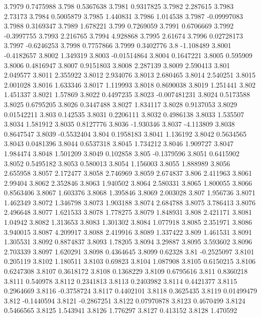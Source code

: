 3.7979  0.7475988
3.798  0.5367638
3.7981  0.9317825
3.7982  2.287615
3.7983  2.73173
3.7984  0.5005879
3.7985  1.440831
3.7986  1.014538
3.7987  -0.09997083
3.7988  0.3169347
3.7989  1.678221
3.799  0.7269059
3.7991  0.6706669
3.7992  -0.3997755
3.7993  2.216765
3.7994  4.928868
3.7995  2.61674
3.7996  0.02728173
3.7997  -0.6246253
3.7998  0.7757866
3.7999  0.3402776
3.8  -1.108489
3.8001  -0.4182657
3.8002  1.349319
3.8003  -0.01514864
3.8004  0.1647221
3.8005  0.595909
3.8006  0.4816947
3.8007  0.9151803
3.8008  2.287139
3.8009  2.590413
3.801  2.049577
3.8011  2.355922
3.8012  2.934076
3.8013  2.680465
3.8014  2.540251
3.8015  2.001028
3.8016  1.633346
3.8017  1.119993
3.8018  0.8690038
3.8019  1.251441
3.802  1.451337
3.8021  1.57869
3.8022  0.4497235
3.8023  -0.007481231
3.8024  0.5173588
3.8025  0.6795205
3.8026  0.3447488
3.8027  1.834117
3.8028  0.9137053
3.8029  0.01542211
3.803  0.142535
3.8031  0.2206111
3.8032  0.4986138
3.8033  1.535507
3.8034  1.581912
3.8035  0.8127776
3.8036  -1.930346
3.8037  -4.113809
3.8038  0.8647547
3.8039  -0.5532404
3.804  0.1958183
3.8041  1.136192
3.8042  0.5634565
3.8043  0.0481396
3.8044  0.6537318
3.8045  1.734212
3.8046  1.909727
3.8047  1.984474
3.8048  1.501209
3.8049  0.102858
3.805  -0.1379596
3.8051  0.6415902
3.8052  0.5495182
3.8053  0.580013
3.8054  1.156003
3.8055  1.888989
3.8056  2.655958
3.8057  2.172477
3.8058  2.746969
3.8059  2.674837
3.806  2.411963
3.8061  2.99404
3.8062  2.352846
3.8063  1.940502
3.8064  2.580331
3.8065  1.800055
3.8066  0.8563406
3.8067  1.603376
3.8068  1.395846
3.8069  2.003028
3.807  1.956736
3.8071  1.462349
3.8072  1.346798
3.8073  1.903188
3.8074  2.684788
3.8075  3.786413
3.8076  2.496648
3.8077  1.621533
3.8078  1.778275
3.8079  1.848931
3.808  2.421171
3.8081  1.04942
3.8082  1.313653
3.8083  1.301302
3.8084  1.077918
3.8085  2.351971
3.8086  3.940015
3.8087  4.209917
3.8088  2.419916
3.8089  1.337422
3.809  1.461531
3.8091  1.305531
3.8092  0.8874837
3.8093  1.78205
3.8094  3.29887
3.8095  3.593602
3.8096  2.703339
3.8097  1.620291
3.8098  0.4364645
3.8099  0.62328
3.81  -0.2525097
3.8101  0.205119
3.8102  1.180511
3.8103  0.69823
3.8104  1.087908
3.8105  0.6150215
3.8106  0.6247308
3.8107  0.3618172
3.8108  0.1368229
3.8109  0.6795616
3.811  0.8360218
3.8111  0.540978
3.8112  0.2341813
3.8113  0.2403982
3.8114  0.4421377
3.8115  0.2964669
3.8116  -0.3758724
3.8117  0.4402101
3.8118  0.3625435
3.8119  0.01499479
3.812  -0.1440594
3.8121  -0.2867251
3.8122  0.07970878
3.8123  0.4670499
3.8124  0.5466565
3.8125  1.543941
3.8126  1.776297
3.8127  0.413152
3.8128  1.470592
